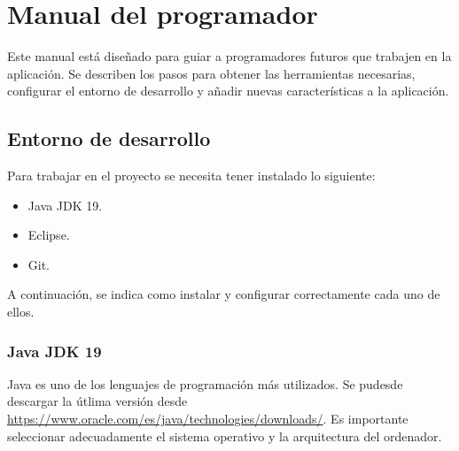 
\section{Manual del programador}

Este manual está diseñado para guiar a programadores futuros que trabajen en la aplicación. Se describen los pasos para obtener las herramientas necesarias, configurar el entorno de desarrollo y añadir nuevas características a la aplicación.

\subsection{Entorno de desarrollo}
Para trabajar en el proyecto se necesita tener instalado lo siguiente:

\begin{itemize}
\tightlist
\item
  Java JDK 19.
\item
  Eclipse.
\item
  Git.
\end{itemize}

A continuación, se indica como instalar y configurar correctamente cada uno de ellos.

\subsubsection{Java JDK 19}
Java es uno de los lenguajes de programación más utilizados. Se pudesde descargar la útlima versión desde \url{https://www.oracle.com/es/java/technologies/downloads/}. Es importante seleccionar adecuadamente el sistema operativo y la arquitectura del ordenador. \cite{wiki:jdk}

